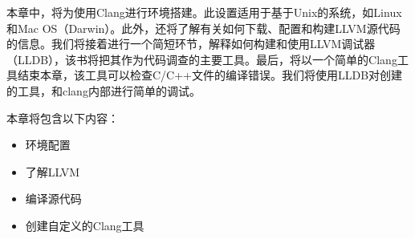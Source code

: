 
本章中，将为使用Clang进行环境搭建。此设置适用于基于Unix的系统，如Linux和Mac OS（Darwin）。此外，还将了解有关如何下载、配置和构建LLVM源代码的信息。我们将接着进行一个简短环节，解释如何构建和使用LLVM调试器（LLDB），该书将把其作为代码调查的主要工具。最后，将以一个简单的Clang工具结束本章，该工具可以检查C/C++文件的编译错误。我们将使用LLDB对创建的工具，和clang内部进行简单的调试。

本章将包含以下内容：

\begin{itemize}
\item
环境配置

\item
了解LLVM

\item
编译源代码

\item
创建自定义的Clang工具
\end{itemize}